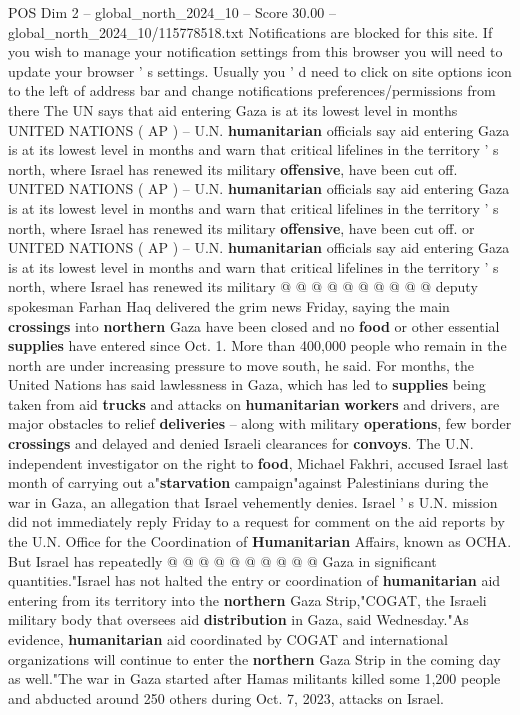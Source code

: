 \begin{textsample}{POS Dim 2 – global\_north\_2024\_10 – Score 30.00 – global\_north\_2024\_10/115778518.txt}  \label{ex:f2_pos_347}
Notifications are blocked for this site.
If you wish to manage your notification settings from this browser you will need to update your browser ' s settings.
Usually you ' d need to click on site options icon to the left of address bar and change notifications preferences/permissions from there The UN says that aid entering Gaza is at its lowest level in months UNITED NATIONS ( AP ) -- U.N. \textbf{humanitarian} officials say aid entering Gaza is at its lowest level in months and warn that critical lifelines in the territory ' s north, where Israel has renewed its military \textbf{offensive}, have been cut off.
UNITED NATIONS ( AP ) -- U.N. \textbf{humanitarian} officials say aid entering Gaza is at its lowest level in months and warn that critical lifelines in the territory ' s north, where Israel has renewed its military \textbf{offensive}, have been cut off. or UNITED NATIONS ( AP ) -- U.N. \textbf{humanitarian} officials say aid entering Gaza is at its lowest level in months and warn that critical lifelines in the territory ' s north, where Israel has renewed its military @ @ @ @ @ @ @ @ @ @ deputy spokesman Farhan Haq delivered the grim news Friday, saying the main \textbf{crossings} into \textbf{northern} Gaza have been closed and no \textbf{food} or other essential \textbf{supplies} have entered since Oct. 1.
More than 400,000 people who remain in the north are under increasing pressure to move south, he said.
For months, the United Nations has said lawlessness in Gaza, which has led to \textbf{supplies} being taken from aid \textbf{trucks} and attacks on \textbf{humanitarian} \textbf{workers} and drivers, are major obstacles to relief \textbf{deliveries} -- along with military \textbf{operations}, few border \textbf{crossings} and delayed and denied Israeli clearances for \textbf{convoys}.
The U.N. independent investigator on the right to \textbf{food}, Michael Fakhri, accused Israel last month of carrying out a"\textbf{starvation} campaign"against Palestinians during the war in Gaza, an allegation that Israel vehemently denies.
Israel ' s U.N. mission did not immediately reply Friday to a request for comment on the aid reports by the U.N.
Office for the Coordination of \textbf{Humanitarian} Affairs, known as OCHA.
But Israel has repeatedly @ @ @ @ @ @ @ @ @ @ Gaza in significant quantities."Israel has not halted the entry or coordination of \textbf{humanitarian} aid entering from its territory into the \textbf{northern} Gaza Strip,"COGAT, the Israeli military body that oversees aid \textbf{distribution} in Gaza, said Wednesday."As evidence, \textbf{humanitarian} aid coordinated by COGAT and international organizations will continue to enter the \textbf{northern} Gaza Strip in the coming day as well."The war in Gaza started after Hamas militants killed some 1,200 people and abducted around 250 others during Oct. 7, 2023, attacks on Israel.

\end{textsample}
